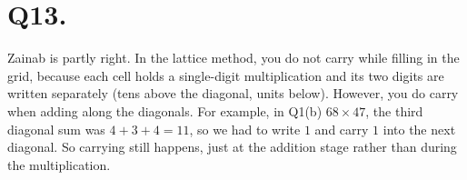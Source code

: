 \documentclass[12pt,a4paper]{article}
\begin{document}
\section*{Q13.}
Zainab is partly right. In the lattice method, you do not carry while filling in the grid, because each cell holds a single-digit multiplication and its two digits are written separately (tens above the diagonal, units below). However, you do carry when adding along the diagonals. For example, in Q1(b) $68\times47$, the third diagonal sum was $4+3+4=11$, so we had to write $1$ and carry $1$ into the next diagonal. So carrying still happens, just at the addition stage rather than during the multiplication.
\end{document}
